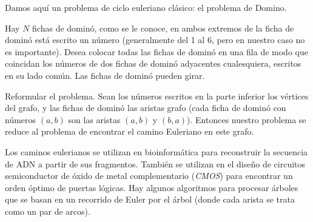 Damos aquí un problema de ciclo euleriano clásico: el problema de Domino.

Hay $N$ fichas de dominó, como se le conoce, en ambos extremos de la ficha de dominó está escrito un número (generalmente del 1 al 6, pero en nuestro caso no es importante). Desea colocar todas las fichas de dominó en una fila de modo que coincidan los números de dos fichas de dominó adyacentes cualesquiera, escritos en su lado común. Las fichas de dominó pueden girar.

Reformular el problema. Sean los números escritos en la parte inferior los vértices del grafo, y las 
fichas de dominó las aristas grafo (cada ficha de dominó con números $(a,b)$ son las aristas $(a,b)$ y 
$(b,a)$). Entonces nuestro problema se reduce al problema de encontrar el camino Euleriano en este grafo.

Los caminos eulerianos se utilizan en bioinformática para reconstruir la secuencia de ADN a partir de sus fragmentos. También se utilizan en el diseño de circuitos semiconductor de óxido de metal complementario (\emph{CMOS})   para encontrar un orden óptimo de puertas lógicas. Hay algunos algoritmos para procesar árboles que se basan en un recorrido de Euler por el árbol (donde cada arista se trata como un par de arcos).